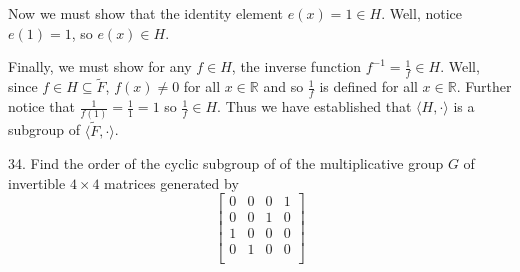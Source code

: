 \documentclass{article}
\begin{document}
Now we must show that the identity element $e(x) = 1 \in H$. Well, notice $e(1) = 1$, so $e(x) \in H$. 
\newline

Finally, we must show for any $f \in H$, the inverse function $f^{-1} = \frac{1}{f} \in H$. Well, since $f \in H \subseteq \tilde{F}$, $f(x) \neq 0$ for all $x \in \mathbb{R}$ and so $\frac{1}{f}$ is defined for all $x \in \mathbb{R}$. Further notice that $\frac{1}{f(1)} = \frac{1}{1} = 1$ so $\frac{1}{f} \in H$. Thus we have established that $\langle H, \cdot \rangle$ is a subgroup of $\langle \tilde{F}, \cdot \rangle$.
\newline

34. Find the order of the cyclic subgroup of of the multiplicative group $G$ of invertible $4 \times 4$ matrices generated by
\[\begin{bmatrix}
    0 & 0 & 0 & 1\\
    0 & 0 & 1 & 0\\
    1 & 0 & 0 & 0\\
    0 & 1 & 0 & 0\\
\end{bmatrix}\]
\end{document}
